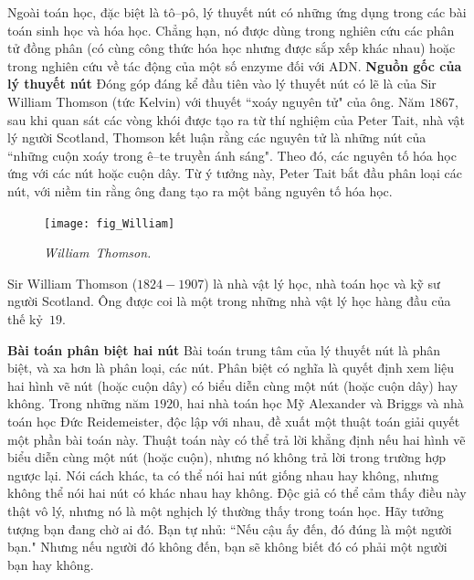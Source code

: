 \begin{multicols}{2}
\begin{figure}[H]
	\end{figure}
	Ngoài toán học, đặc biệt là tô--pô, lý thuyết nút có những ứng dụng trong các bài toán sinh học và hóa học. Chẳng hạn, nó được dùng trong nghiên cứu các phân tử đồng phân (có cùng công thức hóa học nhưng được sắp xếp khác nhau) hoặc trong nghiên cứu về tác động của một số enzyme đối với ADN.
	\vskip 0.1cm
	\textbf{\color{duongvaotoanhoc}Nguồn gốc của lý thuyết nút}
	\vskip 0.1cm
	Đóng góp đáng kể đầu tiên vào lý thuyết nút có lẽ là của Sir William Thomson (tức Kelvin) với thuyết ``xoáy nguyên tử" của ông. Năm $1867$, sau khi quan sát các vòng khói được tạo ra từ thí nghiệm của Peter Tait, nhà vật lý người Scotland, Thomson kết luận rằng các nguyên tử là những nút của ``những cuộn xoáy trong ê--te truyền ánh sáng". Theo đó, các nguyên tố hóa học ứng với các nút hoặc cuộn dây. Từ ý tưởng này, Peter Tait bắt đầu phân loại các nút, với niềm tin rằng ông đang tạo ra một bảng nguyên tố hóa học.
	\begin{tBox}
		\begin{figure}
			\vspace*{-15pt}
			\centering
			\captionsetup{labelformat= empty, justification=centering}
			\hspace*{2pt}\texttt{[image: fig\_William]}
			\caption{\small\textit{\hspace*{2pt}\color{duongvaotoanhoc}William~Thomson.}}
			\vspace*{-10pt}
		\end{figure}
		Sir William Thomson ($1824-1907$) là nhà vật lý học, nhà toán học và kỹ sư người Scotland. Ông được coi là một trong những nhà vật lý học hàng đầu của thế kỷ~$19$.
	\end{tBox}
	\textbf{\color{duongvaotoanhoc}Bài toán phân biệt hai nút}
	\vskip 0.05cm
	Bài toán trung tâm của lý thuyết nút là phân biệt, và xa hơn là phân loại, các nút. Phân biệt có nghĩa là quyết định xem liệu hai hình vẽ nút (hoặc cuộn dây) có biểu diễn cùng một nút (hoặc cuộn dây) hay không. Trong những năm $1920$, hai nhà toán học Mỹ Alexander và Briggs và nhà toán học Đức Reidemeister, độc lập với nhau, đề xuất một thuật toán giải quyết một phần bài toán này. Thuật toán này có thể trả lời khẳng định nếu hai hình vẽ biểu diễn cùng một nút (hoặc cuộn), nhưng nó không trả lời trong trường hợp ngược lại. Nói cách khác, ta có thể nói hai nút giống nhau hay không, nhưng không thể nói hai nút có khác nhau hay không. Độc giả có thể cảm thấy điều này thật vô lý, nhưng nó là một nghịch lý thường thấy trong toán học. Hãy tưởng tượng bạn đang chờ ai đó. Bạn tự nhủ: ``Nếu cậu ấy đến, đó đúng là một người bạn." Nhưng nếu người đó không đến, bạn sẽ không biết đó có phải một người bạn hay không.

\end{multicols}
